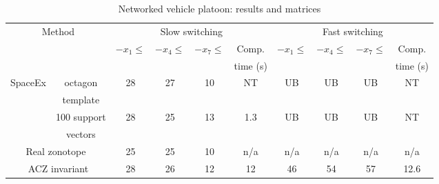 %
%
\begin{table}
\begin{tabular}{|l|c|c|c|c|c|c|c|c|c|}
\hline
\multicolumn{2}{|c|}{\multirow{4}{*}{Method}} & \multicolumn{4}{|c|}{\multirow{2}{*}{Slow switching}} & \multicolumn{4}{|c|}{\multirow{2}{*}{Fast switching}}\\
\multicolumn{2}{|c|}{} & \multicolumn{4}{|c|}{} & \multicolumn{4}{|c|}{} \\
\cline{3-10}
\multicolumn{2}{|c|}{} & \multirow{2}{*}{$-x_1\leq$} & \multirow{2}{*}{$-x_4\leq$} & \multirow{2}{*}{$-x_7\leq$} & Comp. & \multirow{2}{*}{$-x_1\leq$} & \multirow{2}{*}{$-x_4\leq$} & \multirow{2}{*}{$-x_7\leq$} & Comp.\\
\multicolumn{2}{|c|}{} & & & & time (s) & & & & time (s)\\
\hline
\multirow{4}{*}{SpaceEx} & octagon & \multirow{2}{*}{28} &
\multirow{2}{*}{27} & \multirow{2}{*}{10} &
\multirow{2}{*}{NT} & \multirow{2}{*}{UB} &
\multirow{2}{*}{UB} & \multirow{2}{*}{UB} &
\multirow{2}{*}{NT}\\
& template & & & & & & & &\\
\cline{2-10}
& 100 support & \multirow{2}{*}{28} & \multirow{2}{*}{25} &
\multirow{2}{*}{13} & \multirow{2}{*}{1.3} & \multirow{2}{*}{UB} & \multirow{2}{*}{UB} &
\multirow{2}{*}{UB} & \multirow{2}{*}{NT}\\
& vectors & & & & & & & &\\
\hline
\multicolumn{2}{|c|}{\multirow{2}{*}{Real zonotope~\cite{makhlouf2014networked}}} &
\multirow{2}{*}{25} & \multirow{2}{*}{25} & \multirow{2}{*}{10}
 & \multirow{2}{*}{n/a} & \multirow{2}{*}{n/a} & \multirow{2}{*}{n/a} & \multirow{2}{*}{n/a}
 & \multirow{2}{*}{n/a}\\
\multicolumn{2}{|c|}{} & & & & & & & &\\
\hline
\multicolumn{2}{|c|}{\multirow{2}{*}{ACZ invariant}} &
\multirow{2}{*}{28} & \multirow{2}{*}{26} &
\multirow{2}{*}{12} & \multirow{2}{*}{12} &
\multirow{2}{*}{46} & \multirow{2}{*}{54} &
\multirow{2}{*}{57} & \multirow{2}{*}{12.6}\\
\multicolumn{2}{|c|}{} & & & & & & & &\\
\hline
\end{tabular}
%
\caption{Networked
  vehicle platoon: results and matrices}
~\label{tab:largedwell-platoon}
\vspace{-4em}
\end{table}



